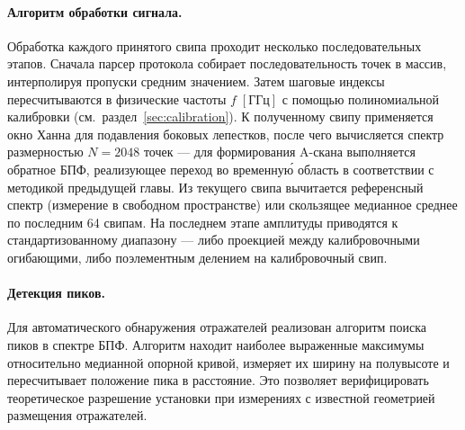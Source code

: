 \paragraph{Алгоритм обработки сигнала.}
Обработка каждого принятого свипа проходит несколько последовательных этапов.
Сначала парсер протокола собирает последовательность точек в массив,
интерполируя пропуски средним значением. Затем шаговые индексы пересчитываются
в физические частоты $f\;[\text{ГГц}]$ с помощью полиномиальной калибровки
(см.~раздел~\ref{sec:calibration}). К полученному свипу применяется окно Ханна
для подавления боковых лепестков, после чего вычисляется спектр размерностью
$N = 2048$ точек --- для формирования A-скана выполняется обратное БПФ,
реализующее переход во временну\'{ю} область в соответствии с методикой
предыдущей главы. Из текущего свипа вычитается референсный спектр (измерение в
свободном пространстве) или скользящее медианное среднее по последним 64 свипам.
На последнем этапе амплитуды приводятся к стандартизованному диапазону --- либо
проекцией между калибровочными огибающими, либо поэлементным делением на
калибровочный свип.

\paragraph{Детекция пиков.}
Для автоматического обнаружения отражателей реализован алгоритм поиска
пиков в спектре БПФ. Алгоритм находит наиболее выраженные максимумы
относительно медианной опорной кривой, измеряет их ширину на полувысоте
и пересчитывает положение пика в расстояние. Это позволяет верифицировать
теоретическое разрешение установки при измерениях с известной геометрией
размещения отражателей.

